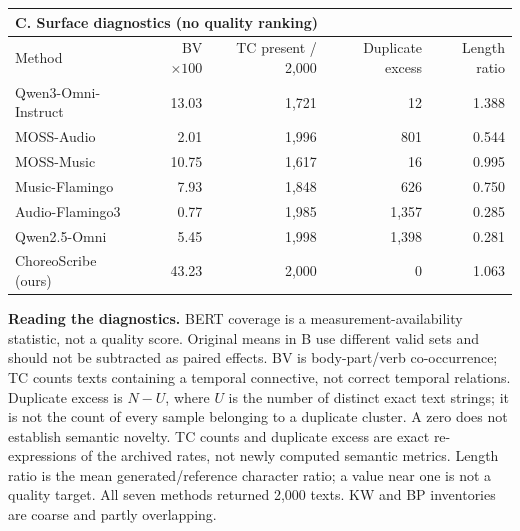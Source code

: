 \begin{table}[!htbp]
\begin{tabular*}{\textwidth}{@{\extracolsep{\fill}}lrrr@{}}
\bottomrule\end{tabular*}\par\vspace{9pt}
\begin{tabular*}{\textwidth}{@{\extracolsep{\fill}}lrrrr@{}}
\toprule
\multicolumn{5}{l}{\textbf{C. Surface diagnostics (no quality ranking)}}\\
\midrule
Method & BV $\times100$ & TC present / 2,000 & Duplicate excess & Length ratio \\
\midrule
Qwen3-Omni-Instruct & 13.03 & 1,721 & 12 & 1.388 \\
MOSS-Audio & 2.01 & 1,996 & 801 & 0.544 \\
MOSS-Music & 10.75 & 1,617 & 16 & 0.995 \\
Music-Flamingo & 7.93 & 1,848 & 626 & 0.750 \\
Audio-Flamingo3 & 0.77 & 1,985 & 1,357 & 0.285 \\
Qwen2.5-Omni & 5.45 & 1,998 & 1,398 & 0.281 \\
ChoreoScribe (ours) & 43.23 & 2,000 & 0 & 1.063 \\
\bottomrule\end{tabular*}
\par\vspace{5pt}
\begin{minipage}{\textwidth}\footnotesize
\textbf{Reading the diagnostics.} BERT coverage is a measurement-availability statistic, not a quality score. Original means in B use different valid sets and should not be subtracted as paired effects. BV is body-part/verb co-occurrence; TC counts texts containing a temporal connective, not correct temporal relations. Duplicate excess is $N-U$, where $U$ is the number of distinct exact text strings; it is not the count of every sample belonging to a duplicate cluster. A zero does not establish semantic novelty. TC counts and duplicate excess are exact re-expressions of the archived rates, not newly computed semantic metrics. Length ratio is the mean generated/reference character ratio; a value near one is not a quality target. All seven methods returned 2,000 texts. KW and BP inventories are coarse and partly overlapping.
\end{minipage}
\endgroup\end{table}
